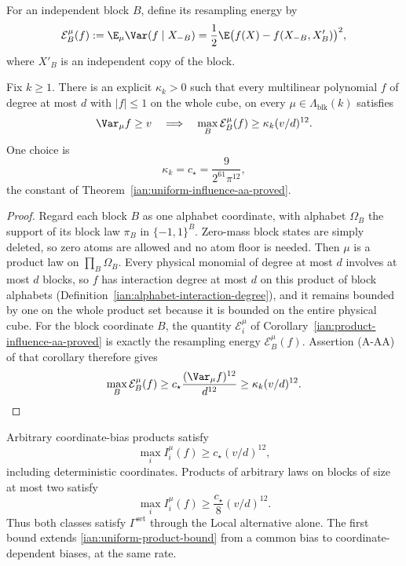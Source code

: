 For an independent block \(B\), define its resampling energy by
\[
 \mathcal E_B^\mu(f)
 :=\E_\mu\Var(f\mid X_{-B})
 =\frac12\E\bigl(f(X)-f(X_{-B},X'_B)\bigr)^2,
\]
where \(X'_B\) is an independent copy of the block.

\begin{lemma}
\label{ian:block-resampling-aa}
Fix \(k\ge1\). There is an explicit
\(\kappa_k>0\) such that every multilinear polynomial \(f\) of degree at
most \(d\) with \(|f|\le1\) on the whole cube, on
every \(\mu\in\Lambda_{\mathrm{blk}}(k)\) satisfies
\[
 \Var_\mu f\ge v
 \quad\Longrightarrow\quad
 \max_B\mathcal E_B^\mu(f)\ge\kappa_k(v/d)^{12}.
\]
One choice is
\[
 \kappa_k=c_\star=\frac{9}{2^{61}\pi^{12}},
\]
the constant of Theorem~\ref{ian:uniform-influence-aa-proved}.
\end{lemma}

\begin{proof}
Regard each block \(B\) as one alphabet coordinate, with alphabet
\(\Omega_B\) the support of its block law \(\pi_B\) in
\(\{-1,1\}^B\). Zero-mass block states are simply deleted, so zero
atoms are allowed and no atom floor is needed. Then \(\mu\) is a
product law on \(\prod_B\Omega_B\). Every physical monomial of degree
at most \(d\) involves at most \(d\) blocks, so \(f\) has interaction
degree at most \(d\) on this product of block alphabets
(Definition~\ref{ian:alphabet-interaction-degree}), and it remains
bounded by one on the whole product set because it is bounded on the
entire physical cube. For the block coordinate \(B\), the quantity
\(\mathcal E_i^\mu\) of
Corollary~\ref{ian:product-influence-aa-proved} is exactly the
resampling energy \(\mathcal E_B^\mu(f)\). Assertion (A-AA) of that
corollary therefore gives
\[
 \max_B\mathcal E_B^\mu(f)
 \ge c_\star\frac{(\Var_\mu f)^{12}}{d^{12}}
 \ge\kappa_k(v/d)^{12}.
\]
\end{proof}

\begin{corollary}
\label{ian:two-spin-blocks}
Arbitrary coordinate-bias products satisfy
\[
 \max_iI_i^\mu(f)\ge c_\star(v/d)^{12},
\]
including deterministic coordinates. Products of arbitrary laws on
blocks of size at most two satisfy
\[
 \max_iI_i^\mu(f)\ge\frac{c_\star}{8}(v/d)^{12}.
\]
Thus both classes satisfy \(\Gamma^{\mathrm{set}}\) through the Local
alternative alone. The first bound extends
\eqref{ian:uniform-product-bound} from a common bias to
coordinate-dependent biases, at the same rate.
\end{corollary}

